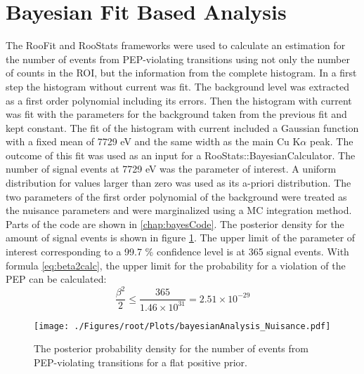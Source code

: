 \section{Bayesian Fit Based Analysis}

The RooFit \cite{Verkerke2003} and RooStats \cite{Moneta2010} frameworks were used to calculate an estimation for the number of events from PEP-violating transitions using not only the number of counts in the ROI, but the information from the complete histogram. In a first step the histogram without current was fit. The background level was extracted as a first order polynomial including its errors. Then the histogram with current was fit with the parameters for the background taken from the previous fit and kept constant. The fit of the histogram with current included a Gaussian function with a fixed mean of 7729 eV and the same width as the main Cu K$\alpha$ peak. The outcome of this fit was used as an input for a RooStats::BayesianCalculator. The number of signal events at 7729 eV was the parameter of interest. A uniform distribution for values larger than zero was used as its a-priori distribution. The two parameters of the first order polynomial of the background were treated as the nuisance parameters and were marginalized using a MC integration method. Parts of the code are shown in \ref{chap:bayesCode}. The posterior density for the amount of signal events is shown in figure \ref{fig:bayesNuis}. The upper limit of the parameter of interest corresponding to a 99.7 \% confidence level is at 365 signal events. With formula \ref{eq:beta2calc}, the upper limit for the probability for a violation of the PEP can be calculated:
\begin{equation}
 \frac{\beta^{2}}{2} \leq \frac{365}{1.46 \times 10^{31}} = 2.51 \times 10^{-29}
\end{equation} 
\begin{figure}[h]
 \centering
 \texttt{[image: ./Figures/root/Plots/bayesianAnalysis\_Nuisance.pdf]}
 \caption{The posterior probability density for the number of events from PEP-violating transitions for a flat positive prior.}
 \label{fig:bayesNuis}
\end{figure}


